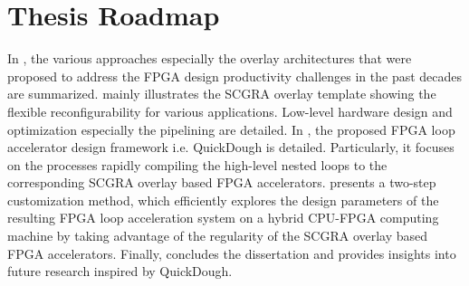 \section{Thesis Roadmap}
In , the various approaches especially the overlay architectures that were proposed to address the FPGA design productivity challenges in the past decades are summarized.  mainly illustrates the SCGRA overlay template showing the flexible reconfigurability for various applications. Low-level hardware design and optimization especially the pipelining are detailed. In , the proposed FPGA loop accelerator design framework i.e. QuickDough is detailed. Particularly, it focuses on the processes rapidly compiling the high-level nested loops to the corresponding SCGRA overlay based FPGA accelerators.  presents a two-step customization method, which efficiently explores the design parameters of the resulting FPGA loop acceleration system on a hybrid CPU-FPGA computing machine by taking advantage of the regularity of the SCGRA overlay based FPGA accelerators. Finally,  concludes the dissertation and provides insights into future research inspired by QuickDough.
